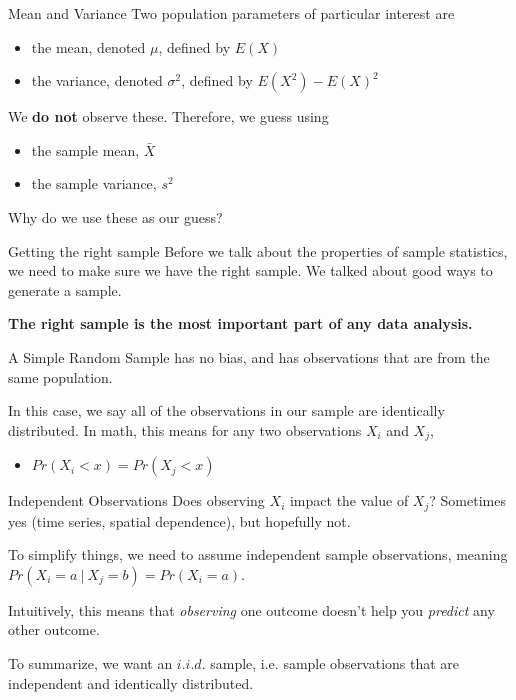 \documentclass{beamer}
\begin{document}
\begin{frame}{Mean and Variance}
	Two population parameters of particular interest are 
	\begin{itemize}
		\item the mean, denoted $\mu$, defined by $E(X)$
		\item the variance, denoted $\sigma^2$, defined by $E(X^2)-E(X)^2$
	\end{itemize}  
	
	We \textbf{do not} observe these. Therefore, we guess using
	
	\begin{itemize}
		\item the sample mean, $\bar{X}$
		\item the sample variance, $s^2$
	\end{itemize}

	Why do we use these as our guess?
\end{frame}
	
\begin{frame}{Getting the right sample}
	Before we talk about the properties of sample statistics, we need to make sure we have the right sample. We talked about good ways to generate a sample.
	
	\textbf{The right sample is the most important part of any data analysis.}  
	
	A Simple Random Sample has no bias, and has observations that are from the same population.
			
	
	 In this case, we say all of the observations in our sample are \alert{identically distributed}.  In math, this means for any two observations $X_i$ and $X_j$,
	\begin{itemize}
		\item $Pr(X_i < x) = Pr(X_j < x)$
	\end{itemize}
\end{frame}

\begin{frame}{Independent Observations}
	Does observing $X_i$ impact the value of $X_j$?  Sometimes yes (time series, spatial dependence), but hopefully not.
	
	To simplify things, we need to assume \alert{independent sample observations}, meaning $Pr(X_i=a \ \vert \ X_j=b) = Pr(X_i=a)$.  
	
	Intuitively, this means that \textit{observing} one outcome doesn't help you \textit{predict} any other outcome.
	
	To summarize, we want an $i.i.d.$ sample, i.e. sample observations that are \alert{independent and identically distributed}.	
\end{frame}
\end{document}
